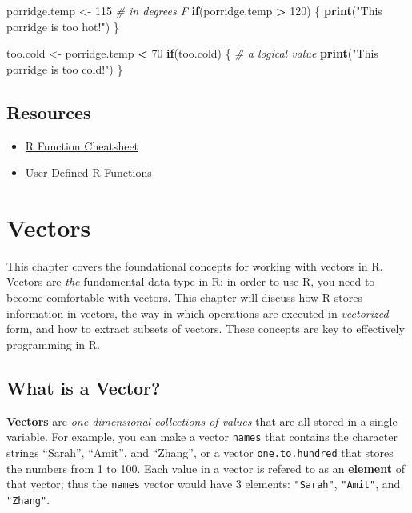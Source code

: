 \documentclass[]{book}
\newenvironment{Shaded}{\begin{snugshade}}{\end{snugshade}}
\newcommand{\KeywordTok}[1]{\textcolor[rgb]{0.13,0.29,0.53}{\textbf{#1}}}
\newcommand{\DecValTok}[1]{\textcolor[rgb]{0.00,0.00,0.81}{#1}}
\newcommand{\StringTok}[1]{\textcolor[rgb]{0.31,0.60,0.02}{#1}}
\newcommand{\CommentTok}[1]{\textcolor[rgb]{0.56,0.35,0.01}{\textit{#1}}}
\newcommand{\ControlFlowTok}[1]{\textcolor[rgb]{0.13,0.29,0.53}{\textbf{#1}}}
\newcommand{\OperatorTok}[1]{\textcolor[rgb]{0.81,0.36,0.00}{\textbf{#1}}}
\newcommand{\NormalTok}[1]{#1}
\providecommand{\tightlist}{%
  \setlength{\itemsep}{0pt}\setlength{\parskip}{0pt}}
\theoremstyle{definition}
\theoremstyle{definition}
\theoremstyle{remark}
\begin{document}
\begin{Shaded}
\begin{Highlighting}[]
\NormalTok{porridge.temp <-}\StringTok{ }\DecValTok{115}  \CommentTok{# in degrees F}
\ControlFlowTok{if}\NormalTok{(porridge.temp }\OperatorTok{>}\StringTok{ }\DecValTok{120}\NormalTok{) \{}
  \KeywordTok{print}\NormalTok{(}\StringTok{"This porridge is too hot!"}\NormalTok{)}
\NormalTok{\}}

\NormalTok{too.cold <-}\StringTok{ }\NormalTok{porridge.temp }\OperatorTok{<}\StringTok{ }\DecValTok{70}
\ControlFlowTok{if}\NormalTok{(too.cold) \{  }\CommentTok{# a logical value}
  \KeywordTok{print}\NormalTok{(}\StringTok{"This porridge is too cold!"}\NormalTok{)}
\NormalTok{\}}
\end{Highlighting}
\end{Shaded}

\section*{Resources}\label{resources-5}


\begin{itemize}
\tightlist
\item
  \href{https://cran.r-project.org/doc/contrib/Short-refcard.pdf}{R
  Function Cheatsheet}
\item
  \href{http://www.statmethods.net/management/userfunctions.html}{User
  Defined R Functions}
\end{itemize}

\hypertarget{vectors}{\chapter{Vectors}\label{vectors}}

This chapter covers the foundational concepts for working with vectors
in R. Vectors are \emph{the} fundamental data type in R: in order to use
R, you need to become comfortable with vectors. This chapter will
discuss how R stores information in vectors, the way in which operations
are executed in \emph{vectorized} form, and how to extract subsets of
vectors. These concepts are key to effectively programming in R.

\section{What is a Vector?}\label{what-is-a-vector}

\textbf{Vectors} are \emph{one-dimensional collections of values} that
are all stored in a single variable. For example, you can make a vector
\texttt{names} that contains the character strings ``Sarah'', ``Amit'',
and ``Zhang'', or a vector \texttt{one.to.hundred} that stores the
numbers from 1 to 100. Each value in a vector is refered to as an
\textbf{element} of that vector; thus the \texttt{names} vector would
have 3 elements: \texttt{"Sarah"}, \texttt{"Amit"}, and
\texttt{"Zhang"}.
\end{document}
